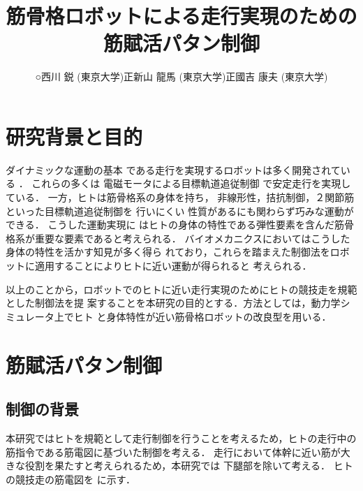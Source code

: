\documentclass[10pt,a4paper]{jsarticle}
\title{筋骨格ロボットによる走行実現のための筋賦活パタン制御}
\author{○西川 鋭 (東京大学)\hspace{2zw}正\hspace{1zw}新山 龍馬 (東京大学)\hspace{2zw}正\hspace{1zw}國吉 康夫 (東京大学)}
\begin{document}
\setlength{\baselineskip}{4.685truemm}%
\maketitle
\thispagestyle{empty}

\section{研究背景と目的}

ダイナミックな運動の基本
である走行を実現するロボットは多く開発されている
\cite{Takenaka2009:Real_Time_Motion_Generation_and_Control_for_Biped_Robot}
．
これらの多くは
電磁モータによる目標軌道追従制御
で安定走行を実現している．
一方，ヒトは筋骨格系の身体を持ち，
非線形性，拮抗制御，２関節筋といった目標軌道追従制御を
行いにくい
性質があるにも関わらず巧みな運動ができる．
こうした運動実現に
はヒトの身体の特性である弾性要素を含んだ筋骨格系が重要な要素であると考えられる．
バイオメカニクスにおいてはこうした身体の特性を活かす知見が多く得ら
れており，これらを踏まえた制御法をロボットに適用することによりヒトに近い運動が得られると
考えられる．

以上のことから，ロボットでのヒトに近い走行実現のためにヒトの競技走を規範とした制御法を提
案することを本研究の目的とする．方法としては，動力学シミュレータ上でヒト
と身体特性が近い筋骨格ロボット\cite{Niiyama2008:Pneumatic_Biped_with_an_Artificial_Musculoskeletal_System}の改良型を用いる．

\vspace{-1mm}
\section{筋賦活パタン制御}
\vspace{-1mm}
\subsection{制御の背景}

本研究ではヒトを規範として走行制御を行うことを考えるため，ヒトの走行中の
筋指令である筋電図に基づいた制御を考える．
走行において体幹に近い筋が大きな役割を果たすと考えられるため，本研究では
下腿部を除いて考える．
ヒトの競技走の筋電図\cite{Baba2000:短距離走の筋活動様式}を
に示す．
\end{document}
